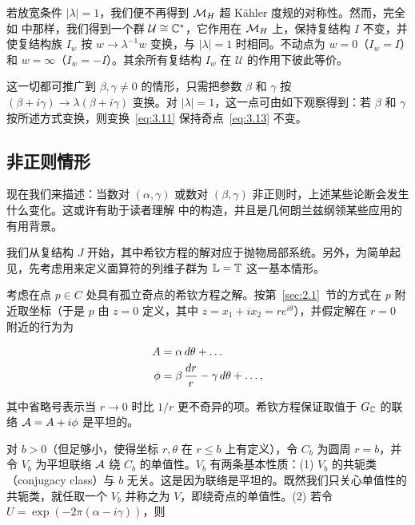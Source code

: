若放宽条件 $|\lambda|=1$，我们便不再得到 ${{\mathcal{M}}_H}$ 超 Kähler 度规的对称性。然而，完全如 \cite{ref21} 中那样，我们得到一个群 ${\mathcal U}\cong {\mathbb{C}}^*$，它作用在 ${{\mathcal{M}}_H}$ 上，保持复结构 $I$ 不变，并使复结构族 $I_w$ 按 $w\to\lambda^{-1}w$ 变换，与 $|\lambda|=1$ 时相同。不动点为 $w=0$（$I_w=I$）和 $w=\infty$（$I_w=-I$）。其余所有复结构
$I_w$ 在 ${\mathcal U}$ 的作用下彼此等价。

这一切都可推广到 $\beta,\gamma\not=0$ 的情形，只需把参数 $\beta$ 和 $\gamma$ 按 $(\beta+i\gamma)\to\lambda(\beta
+i\gamma)$ 变换。对 $|\lambda|=1$，这一点可由如下观察得到：若 $\beta$ 和 $\gamma$ 按所述方式变换，则变换~\eqref{eq:3.11} 保持奇点~\eqref{eq:3.13} 不变。

\subsection{非正则情形}
\label{sec:3.3}

现在我们来描述：当数对 $(\alpha,\gamma)$ 或数对 $(\beta,\gamma)$ 非正则时，上述某些论断会发生什么变化。这或许有助于读者理解 \cite{ref22} 中的构造，并且是几何朗兰兹纲领某些应用的有用背景。

\bigskip{}

我们从复结构 $J$ 开始，其中希钦方程的解对应于抛物局部系统。另外，为简单起见，先考虑用来定义面算符的列维子群为 $\mathbb{L}={\mathbb{T}}$ 这一基本情形。

考虑在点 $p\in C$ 处具有孤立奇点的希钦方程之解。按第~\ref{sec:2.1}~节的方式在 $p$ 附近取坐标（于是 $p$ 由 $z=0$ 定义，其中 $z=x_1+ix_2=re^{i\theta}$），并假定解在 $r=0$ 附近的行为为

\setcounter{equation}{12}
\begin{equation}\label{eq:3.13}
  \begin{aligned}A & = \alpha \,d\theta +\dots\\
           \phi & = \beta\,{dr\over r}-\gamma\,d\theta+\dots,\end{aligned}
\end{equation}

其中省略号表示当 $r\to 0$ 时比 $1/r$ 更不奇异的项。希钦方程保证取值于 $G_{\mathbb{C}}$ 的联络 ${\mathcal A}=A+i\phi$ 是平坦的。

对 $b>0$（但足够小，使得坐标 $r,\theta$ 在 $r\leq b$ 上有定义），令 $C_b$ 为圆周 $r=b$，并令 $V_b$
为平坦联络 ${\mathcal A}$ 绕 $C_b$ 的单值性。$V_b$ 有两条基本性质：(1) $V_b$ 的共轭类（conjugacy class）与 $b$ 无关。这是因为联络是平坦的。既然我们只关心单值性的共轭类，就任取一个 $V_b$ 并称之为 $V$，即绕奇点的单值性。(2) 若令
$U=\exp\left(-2\pi(\alpha-i\gamma)\right)$，则

